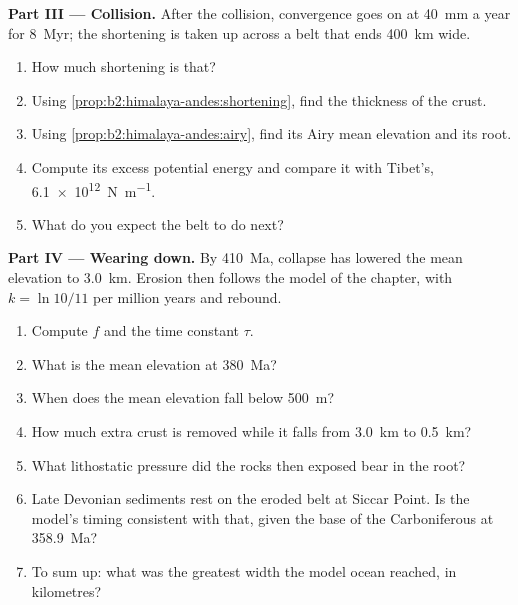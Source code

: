 \begin{problem}
\noindent\textbf{Part III --- Collision.} After the collision, convergence goes on at
\qty{40}{mm} a year for \qty{8}{Myr}; the shortening is taken up across a belt that ends
\qty{400}{km} wide.
\begin{enumerate}[resume]
\item How much shortening is that?
\item Using \cref{prop:b2:himalaya-andes:shortening}, find the thickness of the crust.
\item Using \cref{prop:b2:himalaya-andes:airy}, find its Airy mean elevation and its root.
\item Compute its excess potential energy and compare it with Tibet's,
\qty{6.1e12}{N.m^{-1}}.
\item What do you expect the belt to do next?
\end{enumerate}

\noindent\textbf{Part IV --- Wearing down.} By \qty{410}{Ma}, collapse has lowered the mean
elevation to \qty{3.0}{km}. Erosion then follows the model of the chapter, with $k = \ln
10/11$ per million years and rebound.
\begin{enumerate}[resume]
\item Compute $f$ and the time constant $\tau$.
\item What is the mean elevation at \qty{380}{Ma}?
\item When does the mean elevation fall below \qty{500}{m}?
\item How much extra crust is removed while it falls from \qty{3.0}{km} to \qty{0.5}{km}?
\item What lithostatic pressure did the rocks then exposed bear in the root?
\item Late Devonian sediments rest on the eroded belt at Siccar Point. Is the model's timing
consistent with that, given the base of the Carboniferous at \qty{358.9}{Ma}?
\item To sum up: what was the greatest width the model ocean reached, in kilometres?
\end{enumerate}
\end{problem}
